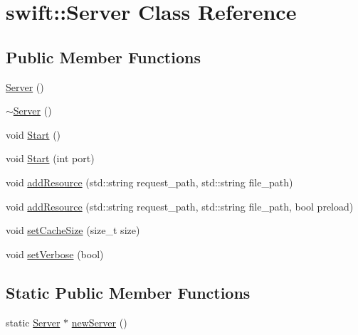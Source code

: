 \hypertarget{classswift_1_1_server}{\section{swift\-:\-:Server Class Reference}
\label{classswift_1_1_server}
}
\subsection*{Public Member Functions}
\begin{DoxyCompactItemize}
\item 
\hyperlink{classswift_1_1_server_a0322af4ef5852cd53e37dc661c46637b}{Server} ()
\item 
\hyperlink{classswift_1_1_server_aef7faff951fc4b6f82450fd93f7c06c5}{$\sim$\-Server} ()
\item 
void \hyperlink{classswift_1_1_server_aff8c9f94b8d827131b0b80b6607ea01f}{Start} ()
\item 
void \hyperlink{classswift_1_1_server_a9778a55fbf0118a856af782d21562019}{Start} (int port)
\item 
void \hyperlink{classswift_1_1_server_ae4354d31df0a668c8de089da2faf1ab2}{add\-Resource} (std\-::string request\-\_\-path, std\-::string file\-\_\-path)
\item 
void \hyperlink{classswift_1_1_server_ac07ca21b3203f486ae6372d7accfabce}{add\-Resource} (std\-::string request\-\_\-path, std\-::string file\-\_\-path, bool preload)
\item 
void \hyperlink{classswift_1_1_server_ad94cc232553cbbddb57463c343456e18}{set\-Cache\-Size} (size\-\_\-t size)
\item 
void \hyperlink{classswift_1_1_server_a689cb1da20caa7c8a5ac733a4259f87b}{set\-Verbose} (bool)
\end{DoxyCompactItemize}
\subsection*{Static Public Member Functions}
\begin{DoxyCompactItemize}
\item 
static \hyperlink{classswift_1_1_server}{Server} $\ast$ \hyperlink{classswift_1_1_server_a305f7482f2229d522a08f1d92b36dea2}{new\-Server} ()
\end{DoxyCompactItemize}


